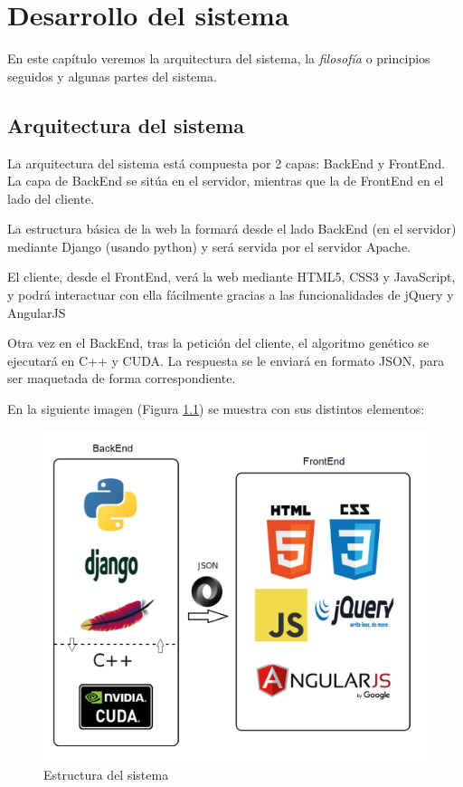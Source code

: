\chapter{Desarrollo del sistema}

\bigskip
En este capítulo veremos la arquitectura del sistema, la \textit{filosofía} o principios seguidos y algunas partes del sistema.


\bigskip
\section{Arquitectura del sistema}
\bigskip

La arquitectura del sistema está compuesta por 2 capas: BackEnd y FrontEnd. La capa de BackEnd se sitúa en el servidor, mientras que la de FrontEnd en el lado del cliente.

\bigskip
La estructura básica de la web la formará desde el lado BackEnd (en el servidor) mediante Django (usando python) y será servida por el servidor Apache. 

El cliente, desde el FrontEnd, verá la web mediante HTML5, CSS3 y JavaScript, y podrá interactuar con ella fácilmente gracias a las funcionalidades de jQuery y AngularJS

Otra vez en el BackEnd, tras la petición del cliente, el algoritmo genético se ejecutará en C++ y CUDA. La respuesta se le enviará en formato JSON, para ser maquetada de forma correspondiente.


\bigskip
En la siguiente imagen (Figura \ref{fig:estructura}) se muestra con sus distintos elementos:

\bigskip
\begin{figure}[h]
	\centering
	\includegraphics[width=1\linewidth]{../images/estructura}
	\caption[Estructura del sistema]{Estructura del sistema}
	\label{fig:estructura}
\end{figure}



